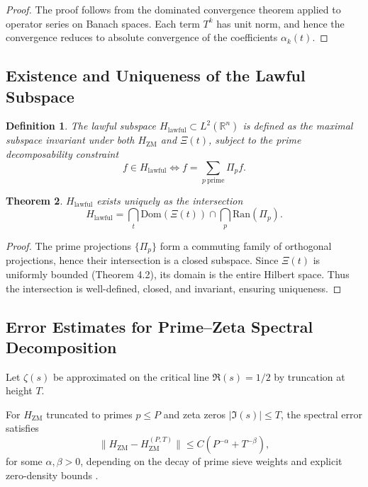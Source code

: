 \documentclass[12]{amsart}
\newtheorem{theorem}{Theorem}
\theoremstyle{plain}
\newtheorem{definition}[theorem]{Definition}
\begin{document}
\begin{proof}
The proof follows from the dominated convergence theorem applied to operator series on Banach spaces. Each term $T^k$ has unit norm, and hence the convergence reduces to absolute convergence of the coefficients $\alpha_k(t)$.
\end{proof}

\subsection{Existence and Uniqueness of the Lawful Subspace}

\begin{definition}
The \emph{lawful subspace} $H_{\mathrm{lawful}} \subset L^2(\mathbb{R}^n)$ is defined as the maximal subspace invariant under both $H_{\mathrm{ZM}}$ and $\Xi(t)$, subject to the prime decomposability constraint
\begin{equation}
    f \in H_{\mathrm{lawful}} \iff f = \sum_{p \ \mathrm{prime}} \Pi_p f .
\end{equation}
\end{definition}

\begin{theorem}
$H_{\mathrm{lawful}}$ exists uniquely as the intersection
\begin{equation}
    H_{\mathrm{lawful}} = \bigcap_{t} \mathrm{Dom}(\Xi(t)) \cap \bigcap_{p} \mathrm{Ran}(\Pi_p) .
\end{equation}
\end{theorem}

\begin{proof}
The prime projections $\{ \Pi_p \}$ form a commuting family of orthogonal projections, hence their intersection is a closed subspace. Since $\Xi(t)$ is uniformly bounded (Theorem 4.2), its domain is the entire Hilbert space. Thus the intersection is well-defined, closed, and invariant, ensuring uniqueness.
\end{proof}

\subsection{Error Estimates for Prime--Zeta Spectral Decomposition}

Let $\zeta(s)$ be approximated on the critical line $\Re(s) = 1/2$ by truncation at height $T$.  

\begin{proposition}
For $H_{\mathrm{ZM}}$ truncated to primes $p \leq P$ and zeta zeros $|\Im(s)| \leq T$, the spectral error satisfies
\begin{equation}
    \| H_{\mathrm{ZM}} - H_{\mathrm{ZM}}^{(P,T)} \| \leq C \left( P^{-\alpha} + T^{-\beta} \right) ,
\end{equation}
for some $\alpha, \beta > 0$, depending on the decay of prime sieve weights and explicit zero-density bounds \cite{Montgomery1973, IwaniecKowalski2004}.
\end{proposition}
\end{document}
